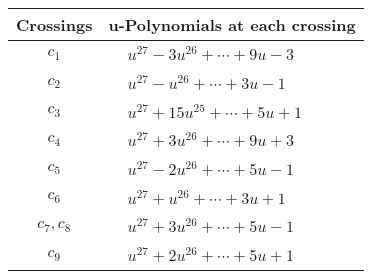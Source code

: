\documentclass[1p]{elsarticle_modified}
\theoremstyle{definition}
\begin{document}
\begin{tabular}{m{50pt}|m{274pt}}
Crossings & \hspace{64pt}u-Polynomials at each crossing \\
\hline $$\begin{aligned}c_{1}\end{aligned}$$&$\begin{aligned}
&u^{27}-3 u^{26}+\cdots+9 u-3
\end{aligned}$\\
\hline $$\begin{aligned}c_{2}\end{aligned}$$&$\begin{aligned}
&u^{27}- u^{26}+\cdots+3 u-1
\end{aligned}$\\
\hline $$\begin{aligned}c_{3}\end{aligned}$$&$\begin{aligned}
&u^{27}+15 u^{25}+\cdots+5 u+1
\end{aligned}$\\
\hline $$\begin{aligned}c_{4}\end{aligned}$$&$\begin{aligned}
&u^{27}+3 u^{26}+\cdots+9 u+3
\end{aligned}$\\
\hline $$\begin{aligned}c_{5}\end{aligned}$$&$\begin{aligned}
&u^{27}-2 u^{26}+\cdots+5 u-1
\end{aligned}$\\
\hline $$\begin{aligned}c_{6}\end{aligned}$$&$\begin{aligned}
&u^{27}+u^{26}+\cdots+3 u+1
\end{aligned}$\\
\hline $$\begin{aligned}c_{7},c_{8}\end{aligned}$$&$\begin{aligned}
&u^{27}+3 u^{26}+\cdots+5 u-1
\end{aligned}$\\
\hline $$\begin{aligned}c_{9}\end{aligned}$$&$\begin{aligned}
&u^{27}+2 u^{26}+\cdots+5 u+1
\end{aligned}$\\

\end{tabular}
\end{document}
